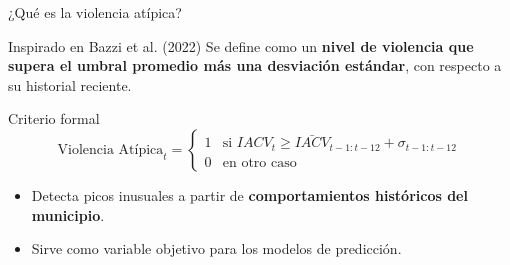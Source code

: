 \begin{frame}{¿Qué es la violencia atípica?}
    \small
    \begin{block}{Inspirado en Bazzi et al. (2022)}
        Se define como un \textbf{nivel de violencia que supera el umbral promedio más una desviación estándar}, con respecto a su historial reciente.
    \end{block}

    \begin{block}{Criterio formal}
        \[
        \text{Violencia Atípica}_{t} = 
        \begin{cases}
            1 & \text{si } IACV_t \geq \bar{IACV}_{t-1:t-12} + \sigma_{t-1:t-12} \\
            0 & \text{en otro caso}
        \end{cases}
        \]
    \end{block}

    \begin{itemize}
        \item Detecta picos inusuales a partir de \textbf{comportamientos históricos del municipio}.
        \item Sirve como variable objetivo para los modelos de predicción.
    \end{itemize}
\end{frame}